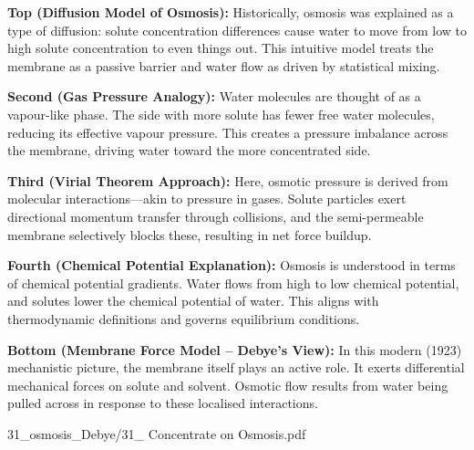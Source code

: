 \begin{SideNotePage}{
  \textbf{Top (Diffusion Model of Osmosis):}  
  Historically, osmosis was explained as a type of diffusion: solute concentration differences cause water to move from low to high solute concentration to \QSOpen{}even things out.\QSClose{} This intuitive model treats the membrane as a passive barrier and water flow as driven by statistical mixing. \par

  \textbf{Second (Gas Pressure Analogy):}  
  Water molecules are thought of as a vapour-like phase. The side with more solute has fewer free water molecules, reducing its effective vapour pressure. This creates a pressure imbalance across the membrane, driving water toward the more concentrated side. \par

  \textbf{Third (Virial Theorem Approach):}  
  Here, osmotic pressure is derived from molecular interactions—akin to pressure in gases. Solute particles exert directional momentum transfer through collisions, and the semi-permeable membrane selectively blocks these, resulting in net force buildup. \par

  \textbf{Fourth (Chemical Potential Explanation):}  
  Osmosis is understood in terms of chemical potential gradients. Water flows from high to low chemical potential, and solutes lower the chemical potential of water. This aligns with thermodynamic definitions and governs equilibrium conditions. \par

  \textbf{Bottom (Membrane Force Model – Debye's View):}  
  In this modern (1923) mechanistic picture, the membrane itself plays an active role. It exerts differential mechanical forces on solute and solvent. Osmotic flow results from water being pulled across in response to these localised interactions. \par
}{31_osmosis_Debye/31_ Concentrate on Osmosis.pdf}
\end{SideNotePage}
